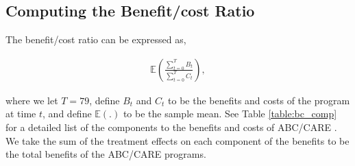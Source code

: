 

\subsection{Computing the Benefit/cost Ratio}
\label{app:method_cbratio}

\noindent The benefit/cost ratio can be expressed as,

\begin{align}
\mathbb{E} \left( \frac{ \sum_{t=0}^T B_t}{\sum_{t=0}^T C_t} \right),
\end{align}

\noindent where we let $T = 79$, define $B_t$ and $C_t$ to be the benefits and costs of the
program at time $t$, and define $\mathbb{E}(.)$ to be the sample mean. See Table \ref{table:bc_comp} for a detailed list of the components
to the benefits and costs of ABC/CARE . We take the sum of the treatment effects on each component
of the benefits to be the total benefits of the ABC/CARE programs. \\

